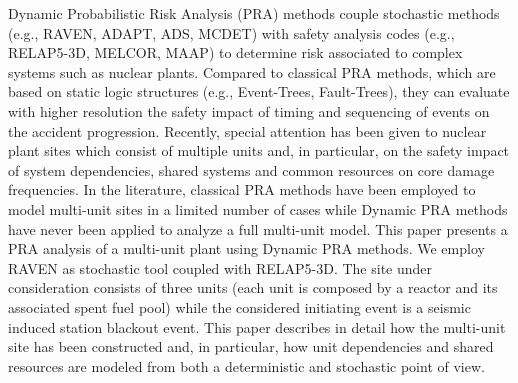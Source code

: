 Dynamic Probabilistic Risk Analysis (PRA) methods couple stochastic methods 
(e.g., RAVEN, ADAPT, ADS, MCDET) with safety analysis codes (e.g., RELAP5-3D, 
MELCOR, MAAP) to determine risk associated to complex systems such as nuclear 
plants. Compared to classical PRA methods, which are based on static logic 
structures (e.g., Event-Trees, Fault-Trees), they can evaluate with higher 
resolution the safety impact of timing and sequencing of events on the 
accident progression. 
Recently, special attention has been given to nuclear 
plant sites which consist of multiple units and, in particular, on the safety 
impact of system dependencies, shared systems and common resources on core 
damage frequencies. 
In the literature, classical PRA methods have been employed to model multi-unit 
sites in a limited number of cases while Dynamic PRA methods have never been 
applied to analyze a full multi-unit model. 
This paper presents a PRA analysis of a multi-unit plant using Dynamic PRA methods. 
We employ RAVEN as stochastic tool coupled with RELAP5-3D. 
The site under consideration consists of three units (each unit is composed by 
a reactor and its associated 
spent fuel pool) while the considered initiating
event is a seismic induced station blackout event. 
This paper describes in detail 
how the multi-unit site has been constructed and, in particular, how unit 
dependencies and shared resources are modeled from both a deterministic and 
stochastic point of view.